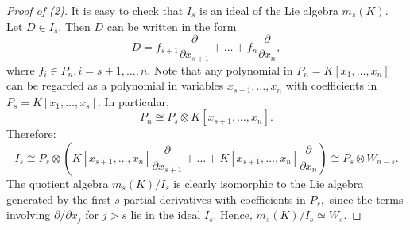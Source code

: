 \documentclass[12pt,a4paper]{amsart}
\theoremstyle{plain}
\theoremstyle{definition}
\begin{document}
\begin{proof}[Proof of (2)]
	It is easy to check that $I_s$ is an ideal of the Lie algebra $m_s(K). $  Let $D \in {I}_{s}$. Then  $D$ can be written in the form
	\[
	D = f_{s+1} \frac{\partial}{\partial x_{s+1}} + \dots + f_n \frac{\partial}{\partial x_n},
	\]
	where  $f_i\in P_n, i=s+1, \ldots , n.$ Note that any polynomial in $P_n = K[x_1, \dots, x_n]$ can be regarded  as a polynomial in variables $x_{s+1}, \dots, x_n$ with coefficients in $P_{s} = K[x_1, \dots, x_{s}]$. In particular, 
	\[
	P_n \cong P_{s} \otimes K[x_{s+1}, \dots, x_n].
	\]
	Therefore:
	\[
	{I}_{s} \cong P_{s} \otimes \left( K[x_{s+1}, \dots, x_n] \frac{\partial}{\partial x_{s+1}} + \dots + K[x_{s+1}, \dots, x_n] \frac{\partial}{\partial x_n} \right) \cong P_{s} \otimes W_{n-s}.
	\]
	The quotient algebra $m_s(K) / {I}_{s}$ is clearly isomorphic to the Lie algebra generated by the first $s$ partial derivatives with coefficients in $P_{s},$ since the terms involving $\partial/\partial x_j$ for $j > s$ lie in the ideal ${I}_{s}$.
	Hence, $m_s(K) / {I}_{s}\simeq  W_{s}$.
	\end{proof}
\end{document}
